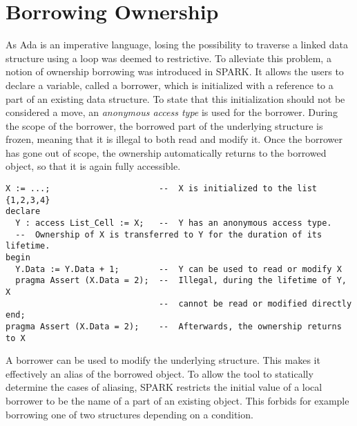 \documentclass[runningheads]{llncs}
\begin{document}
\section{Borrowing Ownership}

As Ada is an imperative language, losing the possibility to traverse a linked data structure using a loop was deemed to restrictive. To alleviate this problem, a notion of ownership borrowing was introduced in SPARK. It allows the users to declare a variable, called a borrower, which is initialized with a reference to a part of an existing data structure. To state that this initialization should not be considered a move, an \emph{anonymous access type} is used for the borrower. During the scope of the borrower, the borrowed part of the underlying structure is frozen, meaning that it is illegal to both read and modify it. %
Once the borrower has gone out of scope, the ownership automatically returns to the borrowed object, so that it is again fully accessible.
\begin{lstlisting}
X := ...;                      --  X is initialized to the list {1,2,3,4}
declare
  Y : access List_Cell := X;   --  Y has an anonymous access type.
  --  Ownership of X is transferred to Y for the duration of its lifetime.
begin
  Y.Data := Y.Data + 1;        --  Y can be used to read or modify X
  pragma Assert (X.Data = 2);  --  Illegal, during the lifetime of Y, X
                               --  cannot be read or modified directly
end;
pragma Assert (X.Data = 2);    --  Afterwards, the ownership returns to X
\end{lstlisting}
A borrower can be used to modify the underlying structure. This makes it effectively an alias of the borrowed object. To allow the tool to statically determine the cases of aliasing, SPARK restricts the initial value of a local borrower to be the name of a part of an existing object. This forbids for example borrowing one of two structures depending on a condition.
\end{document}
